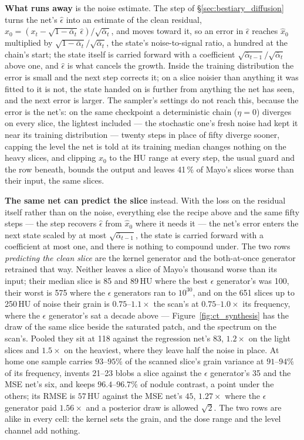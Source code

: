 \medskip\noindent \textbf{What runs away} is the noise estimate. The step
of \S\ref{sec:bestiary_diffusion} turns the net's $\hat\epsilon$ into an
estimate of the clean residual,
$\hat x_0 = (x_t - \sqrt{1-\bar\alpha_t}\,\hat\epsilon)/\sqrt{\bar\alpha_t}$,
and moves toward it, so an error in $\hat\epsilon$ reaches $\hat x_0$
multiplied by $\sqrt{1-\bar\alpha_t}/\sqrt{\bar\alpha_t}$, the state's
noise-to-signal ratio, a hundred at the chain's start; the state itself is
carried forward with a coefficient
$\sqrt{\bar\alpha_{t-1}}/\sqrt{\bar\alpha_t}$ above one, and
$\hat\epsilon$ is what cancels the growth. Inside the training distribution
the error is small and the next step corrects it; on a slice noisier than
anything it was fitted to it is not, the state handed on is further from
anything the net has seen, and the next error is larger. The
sampler's settings do not reach this, because the error is the net's: on
the same checkpoint a deterministic chain ($\eta = 0$) diverges on every
slice, the lightest included --- the stochastic one's fresh noise had
kept it near its training distribution --- twenty steps in place of fifty
diverge sooner, capping the level the net
is told at its training median changes nothing on the heavy slices, and
clipping $\hat x_0$ to the HU range at every step, the usual guard and the
row beneath, bounds the output and leaves 41\,\% of Mayo's slices worse
than their input, the same slices.

\medskip\noindent \textbf{The same net can predict the slice} instead.
With the loss on the residual itself rather than on the noise, everything
else the recipe above and the same fifty steps --- the step recovers
$\hat\epsilon$ from $\hat x_0$ where it needs it --- the net's error enters
the next state scaled by at most $\sqrt{\bar\alpha_{t-1}}$, the state is
carried forward with a coefficient at most one, and there is nothing to
compound under. The two rows \emph{predicting the clean slice} are the
kernel generator and the both-at-once generator retrained that way.
Neither leaves a slice of Mayo's thousand worse than its input; their
median slice is 85 and 89\,HU where the best $\epsilon$ generator's was
100, their worst is 575 where the $\epsilon$ generators ran to $10^{30}$,
and on the 651 slices up to 250\,HU of noise their grain is
$0.75$--$1.1\times$ the scan's at $0.75$--$1.0\times$ its frequency, where
the $\epsilon$ generator's sat a decade above ---
Figure~\ref{fig:ct_synthesis} has the draw of the same slice beside the
saturated patch, and the spectrum on the scan's. Pooled they sit at 118
against the regression net's 83, $1.2\times$ on the light slices and
$1.5\times$ on the heaviest, where they leave half the noise in place.
At home one sample carries $93$--$95\%$ of the
scanned slice's grain variance at $91$--$94\%$ of its frequency, invents
21--23 blobs a slice against the $\epsilon$ generator's 35 and the MSE
net's six, and keeps $96.4$--$96.7\%$ of nodule contrast, a point under the
others; its RMSE is $57$\,HU against the MSE net's $45$, $1.27\times$ where
the $\epsilon$ generator paid $1.56\times$ and a posterior draw is allowed
$\sqrt{2}$. The two rows are alike in every cell: the kernel sets the
grain, and the dose range and the level channel add nothing.


